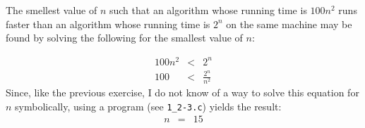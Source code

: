 The smellest value of $n$ such that an algorithm whose running time is $100n^2$ runs faster than an algorithm whose running time is $2^n$ on the same machine may be found by solving the following for the smallest value of $n$:

\begin{eqnarray*}
	100n^2 & < & 2^n \\
	100 & < & \frac{2^n}{n^2}
\end{eqnarray*}
Since, like the previous exercise, I do not know of a way to solve this equation for $n$ symbolically, using a program (see \texttt{1\_2-3.c}) yields the result:
\begin{eqnarray*}
	n & = & 15
\end{eqnarray*}
